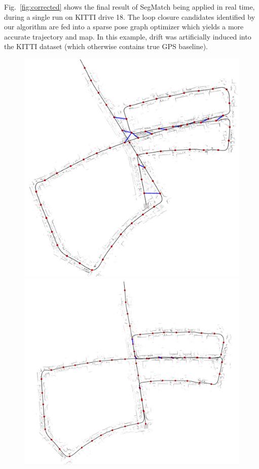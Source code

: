 Fig.~\ref{fig:corrected} shows the final result of SegMatch being applied in real time, during a single run on KITTI drive 18. The loop closure candidates identified by our algorithm are fed into a sparse pose graph optimizer which yields a more accurate trajectory and map. In this example, drift was artificially induced into the KITTI dataset (which otherwise contains true GPS baseline).\\

\begin{figure}[!tbp]
  \centering
  \begin{minipage}[b]{0.4\textwidth}
    \includegraphics[width=\textwidth]{images/before_segmatch.pdf}
  \end{minipage}
  \hfill
  \begin{minipage}[b]{0.4\textwidth}
    \includegraphics[width=\textwidth]{images/after_segmatch.pdf}

\end{minipage}
\end{figure}
